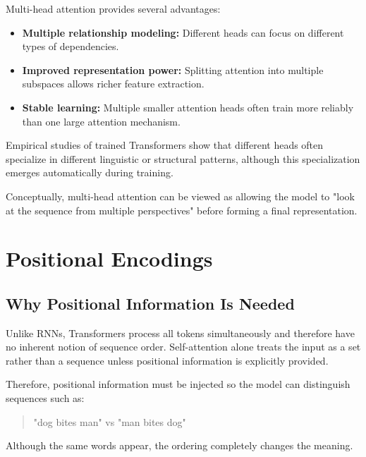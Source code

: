 \documentclass[11pt]{article}
\begin{document}
Multi-head attention provides several advantages:

\begin{itemize}

\item \textbf{Multiple relationship modeling:}
Different heads can focus on different types of dependencies.

\item \textbf{Improved representation power:}
Splitting attention into multiple subspaces allows richer feature extraction.

\item \textbf{Stable learning:}
Multiple smaller attention heads often train more reliably than one large attention mechanism.

\end{itemize}

Empirical studies of trained Transformers show that different heads often specialize in different linguistic or structural patterns, although this specialization emerges automatically during training.

Conceptually, multi-head attention can be viewed as allowing the model to "look at the sequence from multiple perspectives" before forming a final representation.

\section{Positional Encodings}

\subsection{Why Positional Information Is Needed}

Unlike RNNs, Transformers process all tokens simultaneously and therefore have no inherent notion of sequence order. Self-attention alone treats the input as a set rather than a sequence unless positional information is explicitly provided.

Therefore, positional information must be injected so the model can distinguish sequences such as:

\begin{quote}
"dog bites man" vs "man bites dog"
\end{quote}

Although the same words appear, the ordering completely changes the meaning.
\end{document}
